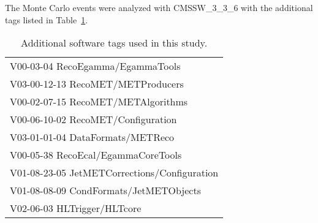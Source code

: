 The Monte Carlo events were analyzed with CMSSW\_3\_3\_6 
with the additional tags listed in Table~\ref{tab:tags}.

\begin{table} [htb]
\begin{center} 
\begin{tabular}{|l|} \hline
{V00-03-04 RecoEgamma/EgammaTools} \\
{V03-00-12-13 RecoMET/METProducers} \\
{V00-02-07-15 RecoMET/METAlgorithms} \\
{V00-06-10-02 RecoMET/Configuration} \\
{V03-01-01-04 DataFormats/METReco} \\
{V00-05-38 RecoEcal/EgammaCoreTools} \\
{V01-08-23-05 JetMETCorrections/Configuration} \\
{V01-08-08-09 CondFormats/JetMETObjects} \\
{V02-06-03 HLTrigger/HLTcore} \\
\hline
\end{tabular}
\caption{Additional software tags used in this study.\label{tab:tags}}
\end{center}
\end{table}
